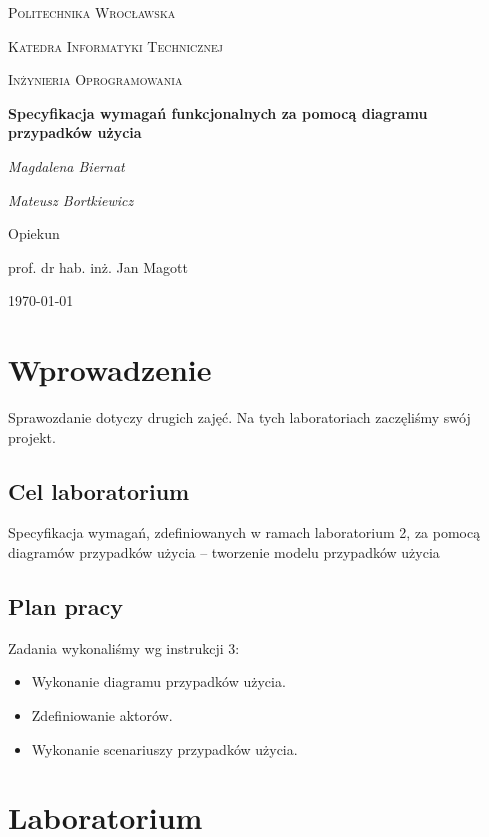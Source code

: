 \documentclass{article}
\begin{document}
	
	\begin{titlepage}
		\centering
		{\scshape\LARGE Politechnika Wrocławska \par}
		{\scshape\Large Katedra Informatyki Technicznej\par}
		
		\vspace{1cm}
		{\scshape\Large Inżynieria Oprogramowania\par}
		\vspace{1.5cm}
		{\huge\bfseries Specyfikacja wymagań funkcjonalnych za pomocą diagramu przypadków użycia\par}
		\vspace{2cm}
		{\Large\itshape Magdalena Biernat\par}
		{\Large\itshape Mateusz Bortkiewicz\par}
		\vfill
		Opiekun\par
		prof. dr hab. inż. Jan Magott 
		
		\vfill
		{\large \today\par}
	\end{titlepage}
	\newpage
	
	\section{Wprowadzenie}
	Sprawozdanie dotyczy drugich zajęć. Na tych laboratoriach zaczęliśmy swój projekt. 
	
	\subsection{Cel laboratorium}
Specyfikacja wymagań, zdefiniowanych w ramach laboratorium 2, za pomocą diagramów przypadków użycia – tworzenie modelu
przypadków użycia 
	
	\subsection{Plan pracy}
	Zadania wykonaliśmy wg instrukcji 3:

	\begin{itemize}
		\item Wykonanie diagramu przypadków użycia.
		\item Zdefiniowanie aktorów.
		\item Wykonanie scenariuszy przypadków użycia.
	\end{itemize}

	\section{Laboratorium}
\end{document}
